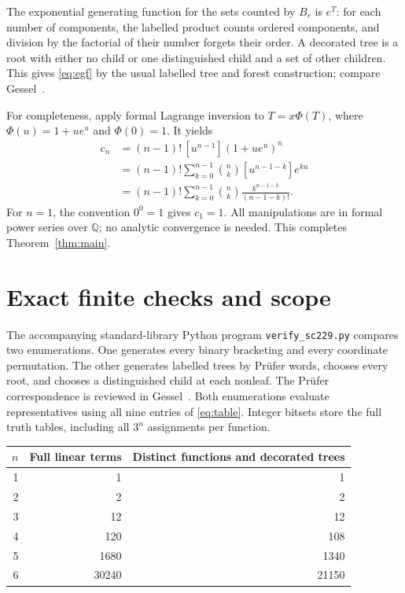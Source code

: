 \documentclass[11pt]{article}
\begin{document}
The exponential generating function for the sets counted by $B_r$ is
$e^T$: for each number of components, the labelled product counts ordered
components, and division by the factorial of their number forgets their
order. A decorated tree is a root with either no child or one distinguished
child and a set of other children. This gives \eqref{eq:egf} by the
usual labelled tree and forest construction; compare
Gessel~\cite[Section~3.2]{Gessel2016}.

For completeness, apply formal Lagrange inversion
\cite[Theorem~2.1.1]{Gessel2016} to $T=x\Phi(T)$, where
$\Phi(u)=1+ue^u$ and $\Phi(0)=1$. It yields
\begin{align*}
c_n
  &=(n-1)!\,[u^{n-1}](1+ue^u)^n\\
  &=(n-1)!\sum_{k=0}^{n-1}\binom{n}{k}
                     [u^{n-1-k}]e^{ku}\\
  &=(n-1)!\sum_{k=0}^{n-1}\binom{n}{k}
                     \frac{k^{n-1-k}}{(n-1-k)!}.
\end{align*}
For $n=1$, the convention $0^0=1$ gives $c_1=1$.
All manipulations are in formal power series over $\mathbb Q$; no
analytic convergence is needed. This completes Theorem~\ref{thm:main}.

\section{Exact finite checks and scope}

The accompanying standard-library Python program
\texttt{verify\_sc229.py} compares two enumerations. One generates every
binary bracketing and every coordinate permutation. The other generates
labelled trees by Pr\"ufer words, chooses every root, and chooses a
distinguished child at each nonleaf. The Pr\"ufer correspondence is
reviewed in Gessel~\cite[Section~4.6]{Gessel2016}. Both enumerations
evaluate representatives using all nine entries of \eqref{eq:table}.
Integer bitsets store the full truth tables, including all $3^n$
assignments per function.

\begin{center}
\begin{tabular}{r r r}
\toprule
$n$ & Full linear terms & Distinct functions and decorated trees\\
\midrule
1 & 1 & 1\\
2 & 2 & 2\\
3 & 12 & 12\\
4 & 120 & 108\\
5 & 1680 & 1340\\
6 & 30240 & 21150\\
\bottomrule
\end{tabular}
\end{center}
\end{document}

